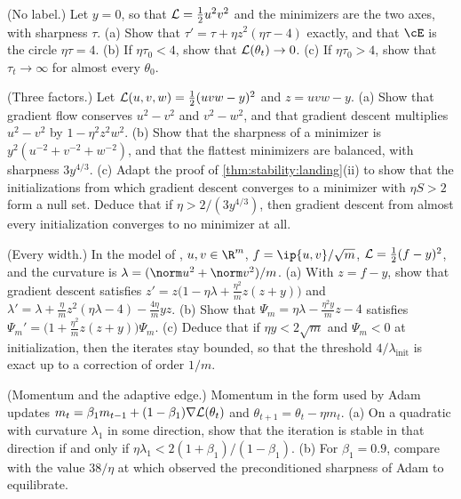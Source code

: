 \begin{refsection}
\begin{exercises}
\item \variation (No label.) Let $y=0$, so that $\mathcal{L}=\frac12u^2v^2$ and the minimizers are the two axes, with sharpness $\tau$. (a) Show that $\tau'=\tau+\eta z^2(\eta\tau-4)$ exactly, and that $\cE$ is the circle $\eta\tau=4$. (b) If $\eta\tau_0<4$, show that $\mathcal{L}(\theta_t)\to0$. (c) If $\eta\tau_0>4$, show that $\tau_t\to\infty$ for almost every $\theta_0$. \label{ex:stability:yzero}

\item \variation (Three factors.) Let $\mathcal{L}(u,v,w)=\frac12(uvw-y)^2$ and $z=uvw-y$. (a) Show that gradient flow conserves $u^2-v^2$ and $v^2-w^2$, and that gradient descent multiplies $u^2-v^2$ by $1-\eta^2z^2w^2$. (b) Show that the sharpness of a minimizer is $y^2(u^{-2}+v^{-2}+w^{-2})$, and that the flattest minimizers are balanced, with sharpness $3y^{4/3}$. (c) Adapt the proof of \cref{thm:stability:landing}(ii) to show that the initializations from which gradient descent converges to a minimizer with $\eta S>2$ form a null set. Deduce that if $\eta>2/(3y^{4/3})$, then gradient descent from almost every initialization converges to no minimizer at all.\label{ex:stability:three}

\item \variation (Every width.) In the model of \textcite{LewkowyczEtAl2020}, $u,v\in\R^m$, $f=\ip{u,v}/\sqrt m$, $\mathcal{L}=\frac12(f-y)^2$, and the curvature is $\lambda=(\norm u^2+\norm v^2)/m$. (a) With $z=f-y$, show that gradient descent satisfies $z'=z\bigl(1-\eta\lambda+\frac{\eta^2}mz(z+y)\bigr)$ and $\lambda'=\lambda+\frac\eta mz^2(\eta\lambda-4)-\frac{4\eta}myz$. (b) Show that $\Psi_m=\eta\lambda-\frac{\eta^2y}mz-4$ satisfies $\Psi_m'=\bigl(1+\frac{\eta^2}mz(z+y)\bigr)\Psi_m$. (c) Deduce that if $\eta y<2\sqrt m$ and $\Psi_m<0$ at initialization, then the iterates stay bounded, so that the threshold $4/\lambda_{\mathrm{init}}$ is exact up to a correction of order $1/m$.\label{ex:stability:width}

\item \variation (Momentum and the adaptive edge.) Momentum in the form used by Adam updates $m_t=\beta_1m_{t-1}+(1-\beta_1)\nabla\mathcal{L}(\theta_t)$ and $\theta_{t+1}=\theta_t-\eta m_t$. (a) On a quadratic with curvature $\lambda_1$ in some direction, show that the iteration is stable in that direction if and only if $\eta\lambda_1<2(1+\beta_1)/(1-\beta_1)$. (b) For $\beta_1=0.9$, compare with the value $38/\eta$ at which \textcite{CohenEtAl2022} observed the preconditioned sharpness of Adam to equilibrate.\label{ex:stability:momentum}


\end{exercises}
\end{refsection}
